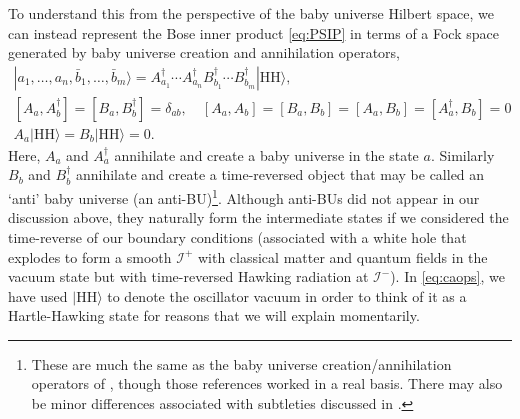 \documentclass[letterpaper,12pt]{article}
\newcommand*{\scri}{\mathscr{I}} %
\newcommand{\HH}{\mathrm{HH}} %
\begin{document}
To understand this from the perspective of the baby universe Hilbert space, we can instead represent the Bose inner product \eqref{eq:PSIP} in terms of a Fock space generated by baby universe creation and annihilation operators,
\begin{gather}
\label{eq:caops}
	|a_1,\ldots,a_n, \bar b_1, \ldots, \bar b_m\rangle = A_{a_1}^\dag \cdots A_{a_n}^\dag B_{b_1}^\dag \cdots B_{b_m}^\dag |\HH\rangle, \\
	[A_a,A^\dag_b] =[B_a,B^\dag_b] = \delta_{ab}, \quad [A_a,A_b]=[B_a,B_b]=[A_a,B_b]=[A^\dag_a,B_b]=0\\
	A_a|\HH\rangle = B_b|\HH\rangle = 0.
\end{gather}
Here, $A_a$ and $A^\dag_a$ annihilate and create a baby universe in the state $a$. Similarly $B_b$ and $B^\dag_b$  annihilate and create a time-reversed object that may be called an `anti' baby universe (an anti-BU)\footnote{These are much the same as the baby universe creation/annihilation operators of \cite{Coleman:1988cy,Giddings:1988cx,Giddings:1988wv}, though those references worked in a real basis.  There may also be minor differences associated with subtleties discussed in \cite{CMMR}.}. Although anti-BUs did not appear in our discussion above, they naturally form the intermediate states if we considered the time-reverse of our boundary conditions (associated with a white hole that explodes to form a smooth $\scri^+$ with classical matter and quantum fields in the vacuum state but with time-reversed Hawking radiation at $\scri^-$).   In \eqref{eq:caops}, we have used $|\HH\rangle$ to denote the oscillator vacuum in order to think of it as a Hartle-Hawking state for reasons that we will explain momentarily.
\end{document}
